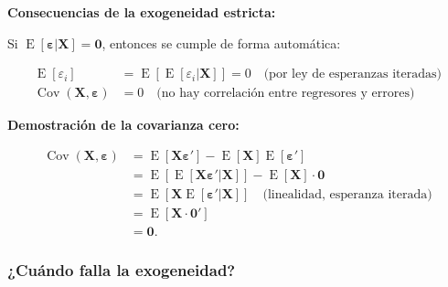 \documentclass[11pt,a4paper]{article}
\DeclareMathOperator{\E}{E}
\DeclareMathOperator{\Cov}{Cov}
\begin{document}
\noindent\textbf{Consecuencias de la exogeneidad estricta:}

Si \(\E[\boldsymbol{\varepsilon}|\mathbf{X}] = \mathbf{0}\), entonces se cumple de forma automática:

\begin{align}
\E[\varepsilon_i] &= \E[\E[\varepsilon_i|\mathbf{X}]] = 0 \quad \text{(por ley de esperanzas iteradas)}\\
\Cov(\mathbf{X}, \boldsymbol{\varepsilon}) &= 0 \quad \text{(no hay correlación entre regresores y errores)}
\end{align}

\noindent\textbf{Demostración de la covarianza cero:}

\begin{align}
\Cov(\mathbf{X}, \boldsymbol{\varepsilon}) &= \E[\mathbf{X}\boldsymbol{\varepsilon}'] - \E[\mathbf{X}]\E[\boldsymbol{\varepsilon}']\\
&= \E[\E[\mathbf{X}\boldsymbol{\varepsilon}'|\mathbf{X}]] - \E[\mathbf{X}] \cdot \mathbf{0}\\
&= \E[\mathbf{X}\E[\boldsymbol{\varepsilon}'|\mathbf{X}]] \quad \text{(linealidad, esperanza iterada)}\\
&= \E[\mathbf{X} \cdot \mathbf{0}']\\
&= \mathbf{0}.
\end{align}
\subsubsection*{¿Cuándo falla la exogeneidad?}
\end{document}
